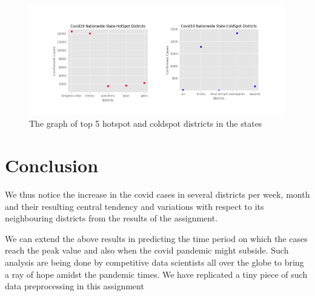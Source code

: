 \documentclass{article}
\begin{document}
\begin{figure}[htp]
    \centering
    \includegraphics[width=15cm]{hotsptandcolspot.png}
    \caption{The graph of top 5 hotspot and coldspot districts in the states}
    \label{fig:hotspot}
\end{figure}
\FloatBarrier

\section{Conclusion}
\vspace{0.5cm}
\hspace{2cm} We thus notice the increase in the covid cases in several districts per week, month and their resulting central tendency and variations with respect to its neighbouring districts from the results of the assignment.\newline

\hspace{2cm}We can extend the above results in predicting the time period on which the cases reach the peak value and also when the covid pandemic might subside. Such analysis are being done by  competitive data scientists all over the globe to bring a ray of hope amidst the pandemic times. We have replicated a tiny piece of such data preprocessing in this assignment
\end{document}
